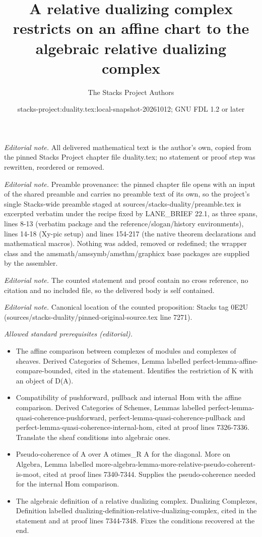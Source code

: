 \documentclass[10pt,a4paper]{amsart}
\title{A relative dualizing complex restricts on an affine chart to the algebraic relative dualizing complex}
\author{The Stacks Project Authors}
\date{stacks-project:duality.tex:local-snapshot-20261012; GNU FDL 1.2 or later}
\theoremstyle{plain}
\theoremstyle{definition}
\theoremstyle{remark}
\numberwithin{equation}{subsection}
\begin{document}
\maketitle
\noindent\textit{Editorial note.} All delivered mathematical text is the author's own, copied from the pinned Stacks Project chapter file duality.tex; no statement or proof step was rewritten, reordered or removed.\par\medskip
\noindent\textit{Editorial note.} Preamble provenance: the pinned chapter file opens with an input of the shared preamble and carries no preamble text of its own, so the project's single Stacks-wide preamble staged at sources/stacks-duality/preamble.tex is excerpted verbatim under the recipe fixed by LANE\_BRIEF 22.1, as three spans, lines 8-13 (verbatim package and the reference/slogan/history environments), lines 14-18 (Xy-pic setup) and lines 154-217 (the native theorem declarations and mathematical macros). Nothing was added, removed or redefined; the wrapper class and the amsmath/amssymb/amsthm/graphicx base packages are supplied by the assembler.\par\medskip
\noindent\textit{Editorial note.} The counted statement and proof contain no cross reference, no citation and no included file, so the delivered body is self contained.\par\medskip
\noindent\textit{Editorial note.} Canonical location of the counted proposition: Stacks tag 0E2U (sources/stacks-duality/pinned-original-source.tex line 7271).\par\medskip
\noindent\textit{Allowed standard prerequisites (editorial).}\begin{itemize}
\item The affine comparison between complexes of modules and complexes of sheaves. Derived Categories of Schemes, Lemma labelled perfect-lemma-affine-compare-bounded, cited in the statement. Identifies the restriction of K with an object of D(A).
\item Compatibility of pushforward, pullback and internal Hom with the affine comparison. Derived Categories of Schemes, Lemmas labelled perfect-lemma-quasi-coherence-pushforward, perfect-lemma-quasi-coherence-pullback and perfect-lemma-quasi-coherence-internal-hom, cited at proof lines 7326-7336. Translate the sheaf conditions into algebraic ones.
\item Pseudo-coherence of A over A otimes\_R A for the diagonal. More on Algebra, Lemma labelled more-algebra-lemma-more-relative-pseudo-coherent-is-moot, cited at proof lines 7340-7344. Supplies the pseudo-coherence needed for the internal Hom comparison.
\item The algebraic definition of a relative dualizing complex. Dualizing Complexes, Definition labelled dualizing-definition-relative-dualizing-complex, cited in the statement and at proof lines 7344-7348. Fixes the conditions recovered at the end.
\end{itemize}\medskip
\end{document}
